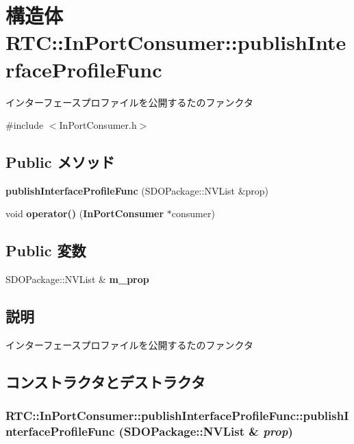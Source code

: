 \section{構造体 RTC::InPortConsumer::publishInterfaceProfileFunc}
\label{structRTC_1_1InPortConsumer_1_1publishInterfaceProfileFunc}


インターフェースプロファイルを公開するたのファンクタ  




{\ttfamily \#include $<$InPortConsumer.h$>$}

\subsection*{Public メソッド}
\begin{DoxyCompactItemize}
\item 
{\bf publishInterfaceProfileFunc} (SDOPackage::NVList \&prop)
\item 
void {\bf operator()} ({\bf InPortConsumer} $\ast$consumer)
\end{DoxyCompactItemize}
\subsection*{Public 変数}
\begin{DoxyCompactItemize}
\item 
SDOPackage::NVList \& {\bf m\_\-prop}
\end{DoxyCompactItemize}


\subsection{説明}
インターフェースプロファイルを公開するたのファンクタ 

\subsection{コンストラクタとデストラクタ}
\subsubsection[{publishInterfaceProfileFunc}]{\setlength{\rightskip}{0pt plus 5cm}RTC::InPortConsumer::publishInterfaceProfileFunc::publishInterfaceProfileFunc (SDOPackage::NVList \& {\em prop})\hspace{0.3cm}{\ttfamily  [inline]}}\label{structRTC_1_1InPortConsumer_1_1publishInterfaceProfileFunc_a56ebfe2cf467594311e114fad2edd54c}



